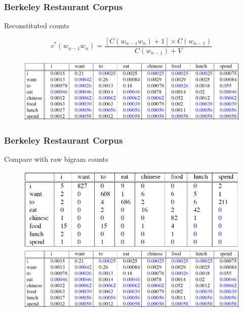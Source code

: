 \documentclass[13.5pt,aspecratio=169]{beamer}
\begin{document}
\begin{frame}
    \onehalfspacing
        \frametitle{Berkeley Restaurant Corpus}
        {\Large Reconstituted counts} \vspace{-2em}
        \begin{center} 
            \[ c^*(w_{n-1} w_{n}) = \frac{[ C(w_{n-1} w_n) + 1] \times C(w_{n-1})} {C(w_{n-1}) + V} \]
          \end{center}
        
            \begin{figure}
                \centering
                \includegraphics [scale=0.45] {laplace_smoothed_bigrams.png}
                
            \end{figure}
    \end{frame}
\begin{frame}
\onehalfspacing
	\frametitle{Berkeley Restaurant Corpus}
    \begin{minipage}{0.5\textwidth}
        \begin{block}{}
            Compare with raw bigram counts
        \end{block}
    \end{minipage}

	\begin{figure}[h]
        \centering
        \includegraphics [scale=0.45] {raw_bigram_counts.png}
        \includegraphics [scale=0.45] {laplace_smoothed_bigrams.png}
    \end{figure}
\end{frame}
\end{document}
